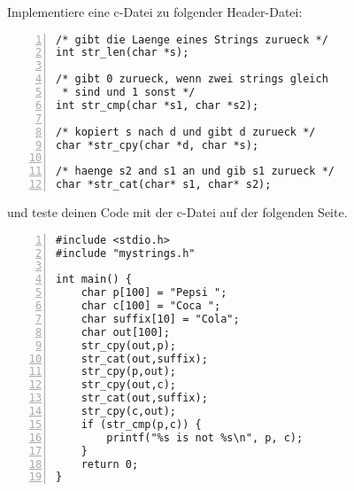 \documentclass{uebungszettel}
\begin{document}
\begin{aufg} Implementiere eine c-Datei zu folgender Header-Datei: 
\begin{codelisting}
\begin{lstlisting}[numbers=left,numberstyle=\tiny,frame=tlrb]
/* gibt die Laenge eines Strings zurueck */
int str_len(char *s); 

/* gibt 0 zurueck, wenn zwei strings gleich 
 * sind und 1 sonst */
int str_cmp(char *s1, char *s2);

/* kopiert s nach d und gibt d zurueck */
char *str_cpy(char *d, char *s);

/* haenge s2 and s1 an und gib s1 zurueck */ 
char *str_cat(char* s1, char* s2);
\end{lstlisting}
\end{codelisting}
und teste deinen Code mit der c-Datei auf der folgenden Seite.

\begin{codelisting}
\begin{lstlisting}[numbers=left,numberstyle=\tiny,frame=tlrb]
#include <stdio.h>
#include "mystrings.h"

int main() {
	char p[100] = "Pepsi ";
	char c[100] = "Coca ";
	char suffix[10] = "Cola";
	char out[100];
	str_cpy(out,p); 
	str_cat(out,suffix); 
	str_cpy(p,out); 
	str_cpy(out,c);
	str_cat(out,suffix); 
	str_cpy(c,out);
	if (str_cmp(p,c)) {
		printf("%s is not %s\n", p, c);
	}
	return 0;
}
\end{lstlisting}
\end{codelisting}
\end{aufg}
\end{document}
